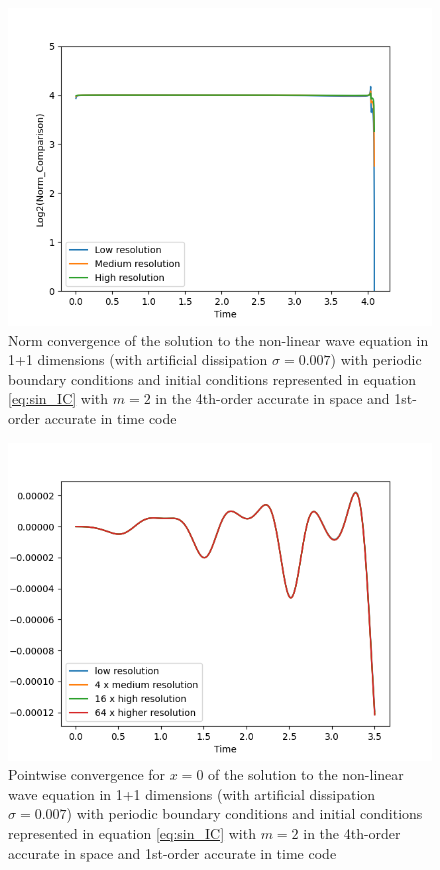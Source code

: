 \begin{figure}[H]
    \centering
    \includegraphics[width=0.9\columnwidth]{Images/non_linear_simple_wave-4th-norm-diss.png}
    \caption{Norm convergence of the solution to the non-linear wave equation in 1+1 dimensions (with artificial dissipation $\sigma = 0.007$) with periodic boundary conditions and initial conditions represented in equation \ref{eq:sin_IC} with $m = 2$ in the 4th-order accurate in space and 1st-order accurate in time code}
    \label{fig:norm_non_linear_simple_wave_4th_order-diss}
\end{figure}

\begin{figure}[H]
    \centering
    \includegraphics[width=0.9\columnwidth]{Images/non_linear_simple_wave-4th-point-diss.png}
    \caption{Pointwise convergence for $x = 0$ of the solution to the non-linear wave equation in 1+1 dimensions (with artificial dissipation $\sigma = 0.007$) with periodic boundary conditions and initial conditions represented in equation \ref{eq:sin_IC} with $m = 2$ in the 4th-order accurate in space and 1st-order accurate in time code}
    \label{fig:point_non_linear_simple_wave_4th_order-diss}
\end{figure}

